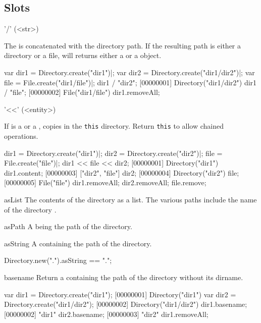 \subsection{Slots}
\begin{urbiscriptapi}
\item['/'](<str>)
  \experimental{}

  The   is concatenated with the directory path.
  If the resulting path is either a directory or a file,  will
  returns either a  or a  object.
\begin{urbiscript}
var dir1 = Directory.create("dir1")|;
var dir2 = Directory.create("dir1/dir2")|;
var file = File.create("dir1/file")|;
dir1 / "dir2";
[00000001] Directory("dir1/dir2")
dir1 / "file";
[00000002] File("dir1/file")
dir1.removeAll;
\end{urbiscript}


\item['<<'](<entity>)
  \experimental{}

  If  is a  or a ,
   copies  in the \lstinline|this| directory.
  Return \lstinline|this| to allow chained operations.
\begin{urbiscript}
dir1 = Directory.create("dir1")|;
dir2 = Directory.create("dir2")|;
file = File.create("file")|;
dir1 << file << dir2;
[00000001] Directory("dir1")
dir1.content;
[00000003] ["dir2", "file"]
dir2;
[00000004] Directory("dir2")
file;
[00000005] File("file")
dir1.removeAll;
dir2.removeAll;
file.remove;
\end{urbiscript}


\item[asList]
  The contents of the directory as a  list.  The
  various paths include the name of the directory \this.


\item[asPath] A  being the path of the directory.


\item[asString] A  containing the path of the directory.
\begin{urbiassert}
Directory.new(".").asString == ".";
\end{urbiassert}


\item[basename]
  Return a  containing the path of the directory without
  its dirname.
\begin{urbiscript}[firstnumber=1]
var dir1 = Directory.create("dir1");
[00000001] Directory("dir1")
var dir2 = Directory.create("dir1/dir2");
[00000002] Directory("dir1/dir2")
dir1.basename;
[00000002] "dir1"
dir2.basename;
[00000003] "dir2"
dir1.removeAll;
\end{urbiscript}



\end{urbiscriptapi}

